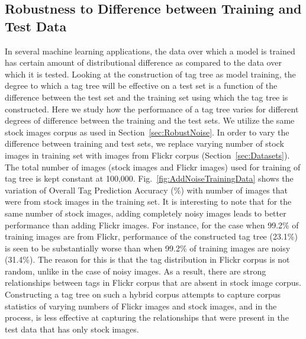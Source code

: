 \subsection{Robustness to Difference between Training and Test Data}
\label{sec:RobustDifference}
In several machine learning applications, the data over which a model is trained has certain amount of distributional difference as compared to the data over which it is tested. Looking at the construction of tag tree as model training, the degree to which a tag tree will be effective on a test set is a function of the difference between the test set and the training set using which the tag tree is constructed. Here we study how the performance of a tag tree varies for different degrees of difference between the training and the test sets. We utilize the same stock images corpus as used in Section~\ref{sec:RobustNoise}. In order to vary the difference between training and test sets, we replace varying number of stock images in training set with images from Flickr corpus (Section~\ref{sec:Datasets}). The total number of images (stock images and Flickr images) used for training of tag tree is kept constant at 100,000. Fig.~\ref{fig:AddNoiseTrainingData} shows the variation of Overall Tag Prediction Accuracy (\%) with number of images that were from stock images in the training set. It is interesting to note that for the same number of stock images, adding completely noisy images leads to better performance than adding Flickr images. For instance, for the case when 99.2\% of training images are from Flickr, performance of the constructed tag tree (23.1\%) is seen to be substantially worse than when 99.2\% of training images are noisy (31.4\%). The reason for this is that the tag distribution in Flickr corpus is not random, unlike in the case of noisy images. As a result, there are strong relationships between tags in Flickr corpus that are absent in stock image corpus. Constructing a tag tree on such a hybrid corpus attempts to capture corpus statistics of varying numbers of Flickr images and stock images, and in the process, is less effective at capturing the relationships that were present in the test data that has only stock images. 


